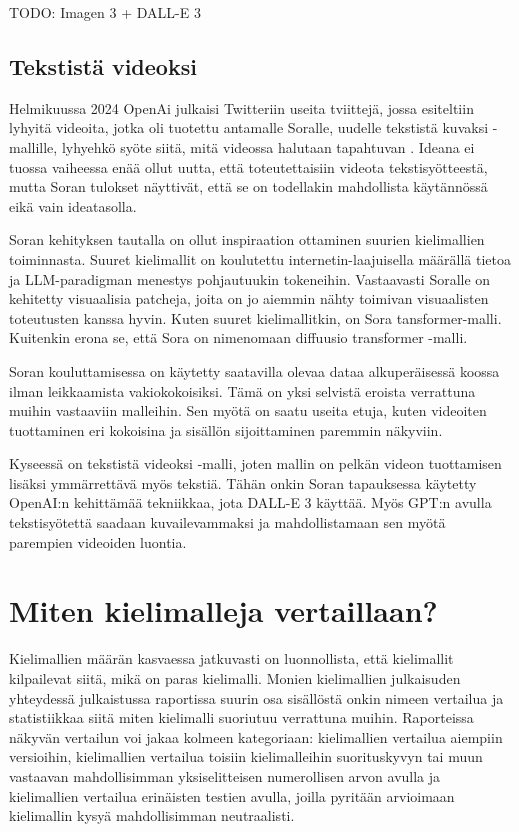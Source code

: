TODO: Imagen 3 + DALL-E 3

\subsection{Tekstistä videoksi}

Helmikuussa 2024 OpenAi julkaisi Twitteriin useita tviittejä, jossa esiteltiin
lyhyitä videoita, jotka oli tuotettu antamalle Soralle, uudelle tekstistä
kuvaksi -mallille, lyhyehkö syöte siitä, mitä videossa halutaan tapahtuvan
\parencite{twitter1758192957386342435}. Ideana ei tuossa vaiheessa enää ollut
uutta, että toteutettaisiin videota tekstisyötteestä, mutta Soran tulokset
näyttivät, että se on todellakin mahdollista käytännössä eikä vain ideatasolla.

Soran kehityksen tautalla on ollut inspiraation ottaminen suurien kielimallien
toiminnasta. Suuret kielimallit on koulutettu internetin-laajuisella määrällä
tietoa ja LLM-paradigman menestys pohjautuukin tokeneihin. Vastaavasti Soralle
on kehitetty visuaalisia patcheja, joita on jo aiemmin nähty toimivan
visuaalisten toteutusten kanssa hyvin. Kuten suuret kielimallitkin, on Sora
tansformer-malli. Kuitenkin erona se, että Sora on nimenomaan diffuusio
transformer -malli. \parencite{openAISoraReport}

Soran kouluttamisessa on käytetty saatavilla olevaa dataa alkuperäisessä koossa
ilman leikkaamista vakiokokoisiksi. Tämä on yksi selvistä eroista verrattuna
muihin vastaaviin malleihin. Sen myötä on saatu useita etuja, kuten videoiten
tuottaminen eri kokoisina ja sisällön sijoittaminen paremmin näkyviin.
\parencite{openAISoraReport}

Kyseessä on tekstistä videoksi -malli, joten mallin on pelkän videon
tuottamisen lisäksi ymmärrettävä myös tekstiä. Tähän onkin Soran tapauksessa
käytetty OpenAI:n kehittämää tekniikkaa, jota DALL-E 3 käyttää. Myös GPT:n
avulla tekstisyötettä saadaan kuvailevammaksi ja mahdollistamaan sen myötä
parempien videoiden luontia. \parencite{openAISoraReport}

\section{Miten kielimalleja vertaillaan?}

Kielimallien määrän kasvaessa jatkuvasti on luonnollista, että kielimallit
kilpailevat siitä, mikä on paras kielimalli. Monien kielimallien julkaisuden
yhteydessä julkaistussa raportissa suurin osa sisällöstä onkin nimeen vertailua
ja statistiikkaa siitä miten kielimalli suoriutuu verrattuna muihin.
Raporteissa näkyvän vertailun voi jakaa kolmeen kategoriaan: kielimallien
vertailua aiempiin versioihin, kielimallien vertailua toisiin kielimalleihin
suorituskyvyn tai muun vastaavan mahdollisimman yksiselitteisen numerollisen
arvon avulla ja kielimallien vertailua erinäisten testien avulla, joilla
pyritään arvioimaan kielimallin kysyä mahdollisimman neutraalisti.

